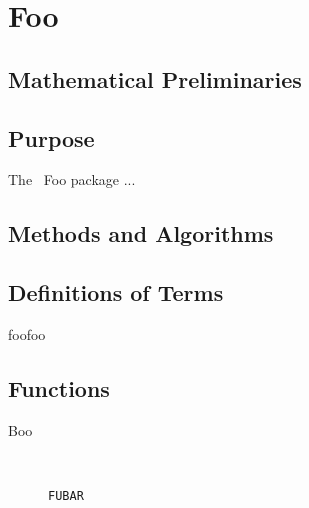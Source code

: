 




\chapter{Foo}

\section{Mathematical Preliminaries}


\section{Purpose}

The \saclib\ Foo package ...


\section{Methods and Algorithms}


\section{Definitions of Terms}

\begin{description}
\item[foofoo]

\end{description}


\section{Functions}

\begin{description}
\item[Boo] \ \
  \begin{description}
  \item[{\tt FUBAR}]

  \end{description}

\end{description}


